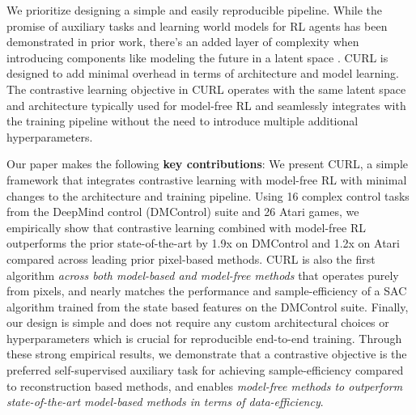 We prioritize designing a simple and easily reproducible pipeline. While the promise of auxiliary tasks and learning world models for RL agents has been demonstrated in prior work, there's an added layer of complexity when introducing components like modeling the future in a latent space \cite{oord2018representation, ha2018world}. CURL is designed to add minimal overhead in terms of architecture and model learning. The contrastive learning objective in CURL operates with the same latent space and architecture typically used for model-free RL and seamlessly integrates with the training pipeline without the need to introduce multiple additional hyperparameters. 

Our paper makes the following {\textbf{key contributions}}: We present CURL, a simple framework that integrates contrastive learning with model-free RL with minimal changes to the architecture and training pipeline. Using 16 complex control tasks from the DeepMind control (DMControl) suite and 26 Atari games, we empirically show that contrastive learning combined with model-free RL outperforms the prior state-of-the-art by 1.9x on DMControl and 1.2x on Atari compared across leading prior pixel-based methods. CURL is also the first algorithm {\it across both model-based and model-free methods} that operates purely from pixels, and nearly matches the performance and sample-efficiency of a SAC algorithm trained from the state based features on the DMControl suite. Finally, our design is simple and does not require any custom architectural choices or hyperparameters which is crucial for reproducible end-to-end training.  Through these strong empirical results, we demonstrate that a contrastive objective is the preferred self-supervised auxiliary task for achieving sample-efficiency compared to reconstruction based methods, and enables {\it model-free methods to outperform state-of-the-art model-based methods in terms of data-efficiency}.
